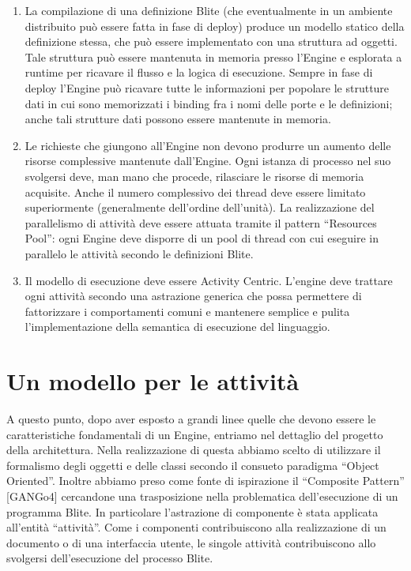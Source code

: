 \begin{enumerate}
  \item La compilazione di una definizione Blite (che eventualmente in un
  ambiente distribuito può essere fatta in fase di deploy) produce un modello
  statico della definizione stessa, che può essere implementato con
  una struttura ad oggetti. Tale struttura può essere mantenuta in memoria
  presso l'Engine e esplorata a runtime per ricavare il
  flusso e la logica di esecuzione. Sempre in fase di deploy l'Engine può
  ricavare tutte le informazioni per popolare le strutture dati in cui sono 
  memorizzati i binding fra i nomi delle porte e le definizioni; anche tali
  strutture dati possono essere mantenute in memoria.
  
  \item Le richieste che giungono all'Engine non devono produrre un aumento
  delle risorse complessive mantenute dall'Engine. Ogni istanza di processo nel
  suo svolgersi deve, man mano che procede, rilasciare le risorse di memoria
  acquisite. Anche il numero complessivo dei thread deve essere limitato
  superiormente (generalmente dell'ordine dell'unità). La realizzazione del
  parallelismo di attività deve essere attuata tramite il pattern ``Resources
  Pool'': ogni Engine deve disporre di un pool di thread con cui eseguire in
  parallelo le attività secondo le definizioni Blite.
  
  \item Il modello di esecuzione deve essere Activity Centric. L'engine deve
  trattare ogni attività secondo una astrazione generica che possa permettere di
  fattorizzare i comportamenti comuni e mantenere semplice e pulita
  l'implementazione della semantica di esecuzione del linguaggio.
\end{enumerate}

\section{Un modello per le attività}
A questo punto, dopo aver esposto a grandi linee quelle che devono essere le
caratteristiche fondamentali di un Engine, entriamo nel dettaglio del progetto
della architettura. Nella realizzazione di questa abbiamo scelto di utilizzare
il formalismo degli oggetti e delle classi secondo il consueto paradigma
``Object Oriented''. Inoltre abbiamo preso come fonte di
ispirazione il ``Composite Pattern'' [GANGo4] cercandone una trasposizione nella
problematica dell'esecuzione di un programma Blite. In particolare
l'astrazione di componente \`e stata applicata all'entità ``attività''. Come i
componenti contribuiscono alla realizzazione di un documento o di una
interfaccia utente, le singole attività contribuiscono allo svolgersi
dell'esecuzione del processo Blite.
 
